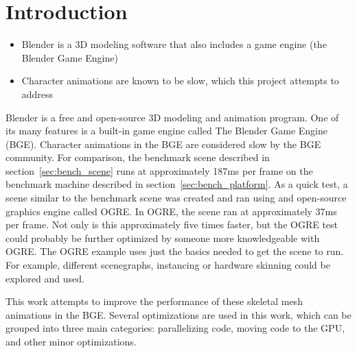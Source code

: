 \section{Introduction}
\ifsummaries
\begin{itemize}
 \item Blender is a 3D modeling software that also includes a game engine (the Blender Game Engine)
 \item Character animations are known to be slow, which this project attempts to address
\end{itemize}
\fi

Blender is a free and open-source 3D modeling and animation program\cite{blender}.
One of its many features is a built-in game engine called The Blender Game Engine (BGE).
Character animations in the BGE are considered slow by the BGE community.
For comparison, the benchmark scene described in section~\ref{sec:bench_scene} runs at approximately 187ms per frame on the benchmark machine described in section~\ref{sec:bench_platform}.
As a quick test, a scene similar to the benchmark scene was created and ran using and open-source graphics engine called OGRE\cite{ogre}.
In OGRE, the scene ran at approximately 37ms per frame.
Not only is this approximately five times faster, but the OGRE test could probably be further optimized by someone more knowledgeable with OGRE.
The OGRE example uses just the basics needed to get the scene to run.
For example, different scenegraphs, instancing or hardware skinning could be explored and used.

This work attempts to improve the performance of these skeletal mesh animations in the BGE.
Several optimizations are used in this work, which can be grouped into three main categories: parallelizing code, moving code to the GPU, and other minor optimizations.
